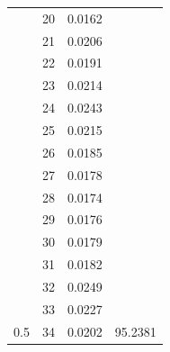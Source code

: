 \documentclass{article}
\begin{document}
\begin{multicols}{2}
\begin{table}[H]
\begin{tabular}{|c|c|c|c|}
 & 20 & 0.0162 & \cellcolor[HTML]{FFFFC7} \\ \cline{2-3}
 & 21 & 0.0206 & \cellcolor[HTML]{FFFFC7} \\ \cline{2-3}
 & 22 & 0.0191 & \cellcolor[HTML]{FFFFC7} \\ \cline{2-3}
 & 23 & 0.0214 & \cellcolor[HTML]{FFFFC7} \\ \cline{2-3}
 & 24 & 0.0243 & \cellcolor[HTML]{FFFFC7} \\ \cline{2-3}
 & 25 & 0.0215 & \cellcolor[HTML]{FFFFC7} \\ \cline{2-3}
 & 26 & 0.0185 & \cellcolor[HTML]{FFFFC7} \\ \cline{2-3}
 & 27 & 0.0178 & \cellcolor[HTML]{FFFFC7} \\ \cline{2-3}
 & 28 & 0.0174 & \cellcolor[HTML]{FFFFC7} \\ \cline{2-3}
 & 29 & 0.0176 & \cellcolor[HTML]{FFFFC7} \\ \cline{2-3}
 & 30 & 0.0179 & \cellcolor[HTML]{FFFFC7} \\ \cline{2-3}
 & 31 & 0.0182 & \cellcolor[HTML]{FFFFC7} \\ \cline{2-3}
 & 32 & 0.0249 & \cellcolor[HTML]{FFFFC7} \\ \cline{2-3}
 & 33 & 0.0227 & \cellcolor[HTML]{FFFFC7} \\ \cline{2-3}
\multirow{-35}{*}{0.5} & 34 & 0.0202 & \multirow{-24}{*}{\cellcolor[HTML]{FFFFC7}95.2381} \\ \hline
\end{tabular}
\end{table}



\end{multicols}
\end{document}
